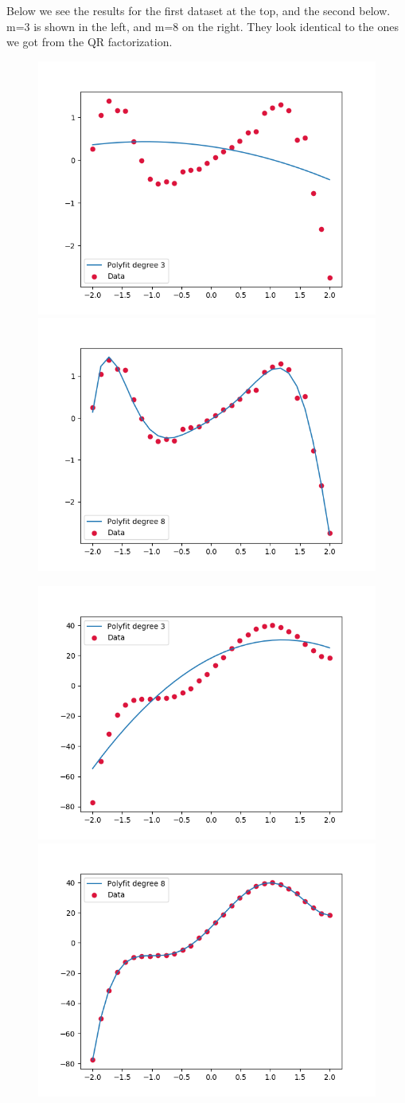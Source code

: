 \documentclass[12p,a4paper]{article}
\begin{document}
Below we see the results for the first dataset at the top, and the second below. m=3 is shown in the left, and m=8 on the right. They look identical to the ones we got from the QR factorization.
\begin{figure}[H]
    \includegraphics[width=0.49\linewidth]{../plots/cholesky_y0_m=3.png}
    \includegraphics[width=0.49\linewidth]{../plots/cholesky_y0_m=8.png}
\end{figure}
\begin{figure}[H]
    \includegraphics[width=0.49\linewidth]{../plots/cholesky_y1_m=3.png}
    \includegraphics[width=0.49\linewidth]{../plots/cholesky_y1_m=8.png}
\end{figure}
    
\end{document}
